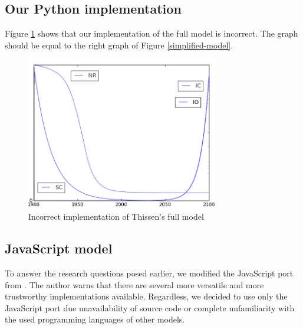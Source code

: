 \documentclass[10pt,a4paper]{scrartcl}
\begin{document}
\subsection*{Our Python implementation}

Figure \ref{fail} shows that our implementation of the full model is incorrect. The graph should be equal to the right graph of Figure \ref{simplified-model}.

\begin{figure}
\centering
\includegraphics[width=0.75\textwidth]{./plaatjes/fail.png}
\caption{Incorrect implementation of Thissen's full model}
\label{fail}
\end{figure}

\subsection*{JavaScript model}

To answer the research questions posed earlier, we modified the JavaScript port from \cite{blogpost}. The author warns that there are several more versatile and more trustworthy implementations available. Regardless, we decided to use only the JavaScript port due unavailability of source code or complete unfamiliarity with the used programming languages of other models.
\end{document}
